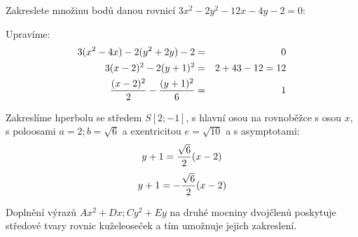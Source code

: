 
\BeginDoc{}


\Pr
Zakreslete množinu bodů danou rovnicí $3x^2-2y^2-12x-4y-2=0$:

Upravíme:
\begin{eqnarray*} 
	3(x^2-4x)-2(y^2+2y)-2&=&0\\
	3(x-2)^2-2(y+1)^2 &=& 2 + 4\*3 - 1 \*2 = 12\\
	\f{(x-2)^2}{2} - \f{(y+1)^2}{6} &=& 1 \\
\end{eqnarray*}

Zakreslíme hperbolu se středem $S[2;-1]$, s hlavní osou na rovnoběžce s osou $x$, s poloosami $a=2;b=\sqrt 6$ a exentricitou $e=\sqrt{10}$ a s asymptotami:
$$y+1 = \frac{\sqrt 6}2(x-2)$$
$$y+1 = -\frac{\sqrt 6}2(x-2)$$

\Poz
Doplnění výrazů $Ax^2+Dx;Cy^2+Ey$ na druhé mocniny dvojčlenů poskytuje středové tvary rovnic kuželeoseček a tím umožnuje jejich zakreslení.

